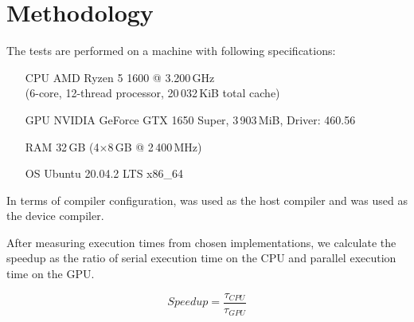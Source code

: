 \section{Methodology}

The tests are performed on a machine with following specifications:

\begin{itemize}
  \item[CPU]{AMD Ryzen 5 1600 @ 3.200\,GHz \\ (6-core, 12-thread processor, 20\,032\,KiB total cache)}
  \item[GPU]{NVIDIA GeForce GTX 1650 Super, 3\,903\,MiB, Driver: 460.56}
  \item[RAM]{32\,GB (4$\times$8\,GB @ 2\,400\,MHz)}
  \item[OS]{Ubuntu 20.04.2 LTS x86\_64}
\end{itemize}

In terms of compiler configuration,  was used as the host compiler and  was used as the device compiler.

After measuring execution times from chosen implementations, we calculate the speedup as the ratio of serial execution time on the CPU and parallel execution time on the GPU.

$$\mathit{Speedup} = \frac{\tau_{\mathit{CPU}}}{\tau_{\mathit{GPU}}}$$

